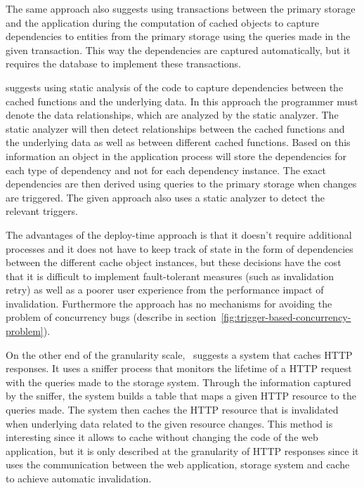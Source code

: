 The same approach also suggests using transactions between the primary storage and the application during the computation of cached objects to capture dependencies to entities from the primary storage using the queries made in the given transaction. This way the dependencies are captured automatically, but it requires the database to implement these transactions.

\cite{paper:deploy-time} suggests using static analysis of the code to capture dependencies between the cached functions and the underlying data. In this approach the programmer must denote the data relationships, which are analyzed by the static analyzer. The static analyzer will then detect relationships between the cached functions and the underlying data as well as between different cached functions. Based on this information an object in the application process will store the dependencies for each type of dependency and not for each dependency instance. The exact dependencies are then derived using queries to the primary storage when changes are triggered. The given approach also uses a static analyzer to detect the relevant triggers.

The advantages of the deploy-time approach is that it doesn't require additional processes and it does not have to keep track of state in the form of dependencies between the different cache object instances, but these decisions have the cost that it is difficult to implement fault-tolerant measures (such as invalidation retry) as well as a poorer user experience from the performance impact of invalidation. Furthermore the approach has no mechanisms for avoiding the problem of concurrency bugs (describe in section~\ref{fig:trigger-based-concurrency-problem}).

On the other end of the granularity scale,~\cite{paper:db-driven-http} suggests a system that caches HTTP responses. It uses a sniffer process that monitors the lifetime of a HTTP request with the queries made to the storage system. Through the information captured by the sniffer, the system builds a table that maps a given HTTP resource to the queries made. The system then caches the HTTP resource that is invalidated when underlying data related to the given resource changes. This method is interesting since it allows to cache without changing the code of the web application, but it is only described at the granularity of HTTP responses since it uses the communication between the web application, storage system and cache to achieve automatic invalidation.

